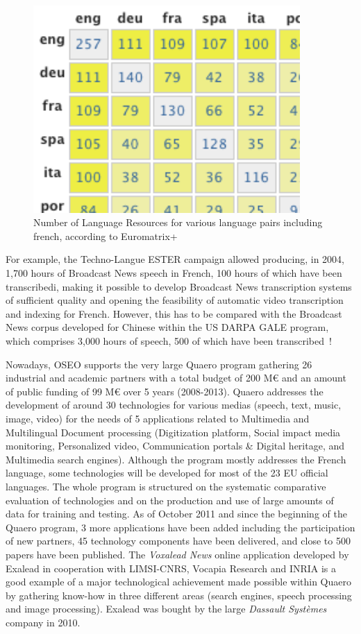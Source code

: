 \documentclass[]{../metanetpaper}
\begin{document}
\begin{multicols}{2}
\begin{figure}
\begin{center}
\includegraphics[width=4.0in]{../_media/french/french_table2_euromatrix.png}
\caption{Number of Language Resources for various language pairs including french, according to Euromatrix+}
\label{fig:EuromatrixFrRessource}
\end{center}
\end{figure}

For example, the Techno-Langue ESTER campaign allowed producing, in
2004, 1,700 hours of Broadcast News speech in French, 100 hours of
which have been transcribedi, making it possible to develop Broadcast
News transcription systems of sufficient quality and opening the
feasibility of automatic video transcription and indexing for
French. However, this has to be compared with the Broadcast News
corpus developed for Chinese within the US DARPA GALE program, which
comprises 3,000 hours of speech, 500 of which have been transcribed~\cite{gale}!

Nowadays, OSEO supports the very large Quaero program gathering 26
industrial and academic partners with a total budget of 200 M€ and an
amount of public funding of 99 M€ over 5 years (2008-2013). Quaero
addresses the development of around 30 technologies for various medias
(speech, text, music, image, video) for the needs of 5 applications
related to Multimedia and Multilingual Document processing
(Digitization platform, Social impact media monitoring, Personalized
video, Communication portals \& Digital heritage, and Multimedia search
engines). Although the program mostly addresses the French language,
some technologies will be developed for most of the 23 EU official
languages. The whole program is structured on the systematic
comparative evaluation of technologies and on the production and use
of large amounts of data for training and testing. As of October 2011
and since the beginning of the Quaero program, 3 more applications
have been added including the participation of new partners, 45
technology components have been delivered, and close to 500 papers
have been published. The {\em Voxalead News} online application developed by
Exalead in cooperation with LIMSI-CNRS, Vocapia Research and INRIA is
a good example of a major technological achievement made possible
within Quaero by gathering know-how in three different areas (search
engines, speech processing and image processing). Exalead was bought
by the large {\em Dassault Systèmes} company in 2010.


\end{multicols}
\end{document}
